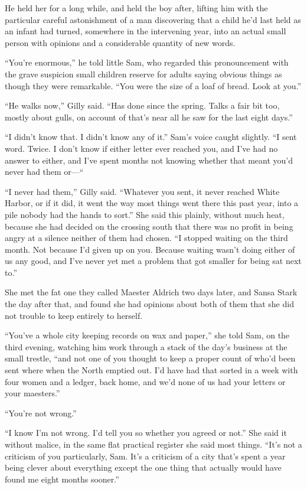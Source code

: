 \sceneBreak

He held her for a long while, and held the boy after, lifting him with the particular careful astonishment of a man discovering that a child he’d last held as an infant had turned, somewhere in the intervening year, into an actual small person with opinions and a considerable quantity of new words.

“You’re enormous,” he told little Sam, who regarded this pronouncement with the grave suspicion small children reserve for adults saying obvious things as though they were remarkable. “You were the size of a loaf of bread. Look at you.”

“He walks now,” Gilly said. “Has done since the spring. Talks a fair bit too, mostly about gulls, on account of that’s near all he saw for the last eight days.”

“I didn’t know that. I didn’t know any of it.” Sam’s voice caught slightly. “I sent word. Twice. I don’t know if either letter ever reached you, and I’ve had no answer to either, and I’ve spent months not knowing whether that meant you’d never had them or—“

“I never had them,” Gilly said. “Whatever you sent, it never reached White Harbor, or if it did, it went the way most things went there this past year, into a pile nobody had the hands to sort.” She said this plainly, without much heat, because she had decided on the crossing south that there was no profit in being angry at a silence neither of them had chosen. “I stopped waiting on the third month. Not because I’d given up on you. Because waiting wasn’t doing either of us any good, and I’ve never yet met a problem that got smaller for being sat next to.”

\sceneBreak

She met the fat one they called Maester Aldrich two days later, and Sansa Stark the day after that, and found she had opinions about both of them that she did not trouble to keep entirely to herself.

“You’ve a whole city keeping records on wax and paper,” she told Sam, on the third evening, watching him work through a stack of the day’s business at the small trestle, “and not one of you thought to keep a proper count of who’d been sent where when the North emptied out. I’d have had that sorted in a week with four women and a ledger, back home, and we’d none of us had your letters or your maesters.”

“You’re not wrong.”

“I know I’m not wrong. I’d tell you so whether you agreed or not.” She said it without malice, in the same flat practical register she said most things. “It’s not a criticism of you particularly, Sam. It’s a criticism of a city that’s spent a year being clever about everything except the one thing that actually would have found me eight months sooner.”

